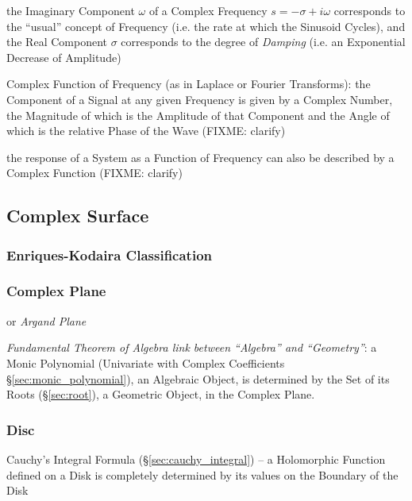 the Imaginary Component $\omega$ of a Complex Frequency $s = -\sigma + i\omega$
corresponds to the ``usual'' concept of Frequency (i.e. the rate at which the
Sinusoid Cycles), and the Real Component $\sigma$ corresponds to the degree of
\emph{Damping} (i.e. an Exponential Decrease of Amplitude)

Complex Function of Frequency (as in Laplace or Fourier Transforms): the
Component of a Signal at any given Frequency is given by a Complex Number, the
Magnitude of which is the Amplitude of that Component and the Angle of which is
the relative Phase of the Wave (FIXME: clarify)

the response of a System as a Function of Frequency can also be described by a
Complex Function (FIXME: clarify)



\subsection{Complex Surface}\label{sec:complex_surface}

\subsubsection{Enriques-Kodaira Classification}
\label{sec:enriques_kodaira}

\subsubsection{Complex Plane}\label{sec:complex_plane}

or \emph{Argand Plane}

\emph{Fundamental Theorem of Algebra link between ``Algebra'' and
  ``Geometry''}: a Monic Polynomial (Univariate with Complex Coefficients
\S\ref{sec:monic_polynomial}), an Algebraic Object, is determined by the Set of
its Roots (\S\ref{sec:root}), a Geometric Object, in the Complex
Plane.



\subsubsection{Disc}\label{sec:disc}

Cauchy's Integral Formula (\S\ref{sec:cauchy_integral}) -- a Holomorphic
Function defined on a Disk is completely determined by its values on the
Boundary of the Disk



